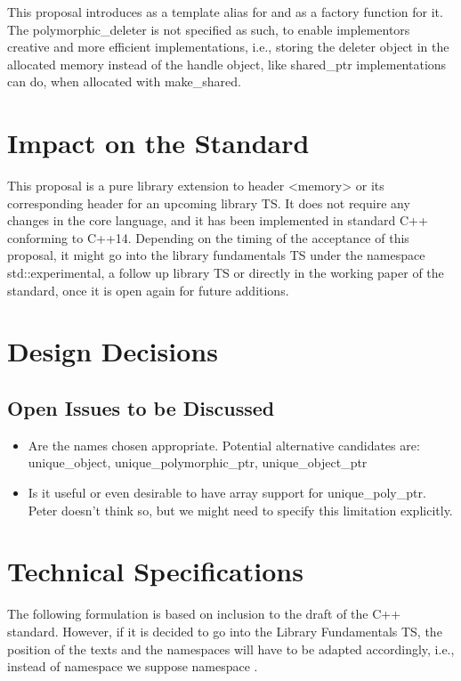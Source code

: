 \documentclass[ebook,11pt,article]{memoir}
\begin{document}
This proposal introduces  as a template alias for  and  as a factory function for it. The polymorphic_deleter is not specified as such, to enable implementors creative and more efficient implementations, i.e., storing the deleter object in the allocated memory instead of the handle object, like shared_ptr implementations can do, when allocated with make_shared.

\chapter{Impact on the Standard}
This proposal is a pure library extension to header <memory> or its corresponding header for an upcoming library TS.  It does not require any changes in the core language, and it has been implemented in standard C++ conforming to C++14. Depending on the timing of the acceptance of this proposal, it might go into the library fundamentals TS under the namespace std::experimental, a follow up library TS or directly in the working paper of the standard, once it is open again for future additions.

\chapter{Design Decisions}

\section{Open Issues to be Discussed}
\begin{itemize}
\item Are the names chosen appropriate. Potential alternative candidates are: unique_object, unique_polymorphic_ptr, unique_object_ptr
\item Is it useful or even desirable to have array support for unique_poly_ptr. Peter doesn't think so, but we might need to specify this limitation explicitly.
\end{itemize}


\chapter{Technical Specifications}
The following formulation is based on inclusion to the draft of the C++ standard. However, if it is decided to go into the Library Fundamentals TS, the position of the texts and the namespaces will have to be adapted accordingly, i.e., instead of namespace  we suppose namespace .
\end{document}
